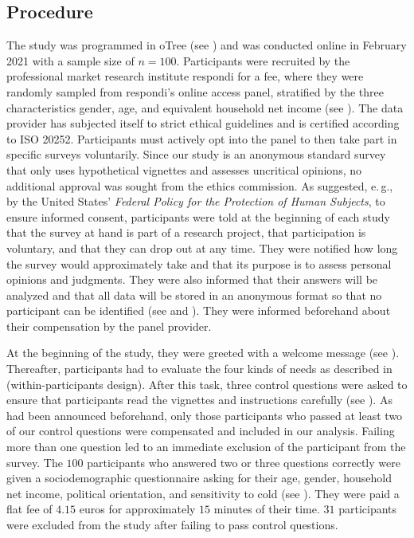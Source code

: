 \documentclass[10pt,letterpaper]{article}
\begin{document}
\subsection*{Procedure}\label{sec:study_1_procedure}
The study was programmed in oTree (see \cite{chen_otree_2016}) and was conducted online in February 2021 with a sample size of $n=100$.
Participants were recruited by the professional market research institute respondi for a fee, where they were randomly sampled from respondi's online access panel, stratified by the three characteristics gender, age, and equivalent household net income (see ).
The data provider has subjected itself to strict ethical guidelines and is certified according to ISO 20252.
Participants must actively opt into the panel to then take part in specific surveys voluntarily.
Since our study is an anonymous standard survey that only uses hypothetical vignettes and assesses uncritical opinions, no additional approval was sought from the ethics commission.
As suggested, e.\,g., by the United States' \textit{Federal Policy for the Protection of Human Subjects}, to ensure informed consent, participants were told at the beginning of each study that the survey at hand is part of a research project, that participation is voluntary, and that they can drop out at any time.
They were notified how long the survey would approximately take and that its purpose is to assess personal opinions and judgments.
They were also informed that their answers will be analyzed and that all data will be stored in an anonymous format so that no participant can be identified (see  and ).
They were informed beforehand about their compensation by the panel provider.

At the beginning of the study, they were greeted with a welcome message (see ).
Thereafter, participants had to evaluate the four kinds of needs as described in  (within-participants design).
After this task, three control questions were asked to ensure that participants read the vignettes and instructions carefully (see ).
As had been announced beforehand, only those participants who passed at least two of our control questions were compensated and included in our analysis.
Failing more than one question led to an immediate exclusion of the participant from the survey.
The $100$ participants who answered two or three questions correctly were given a sociodemographic questionnaire asking for their age, gender, household net income, political orientation, and sensitivity to cold (see ).
They were paid a flat fee of $4.15$ euros for approximately $15$ minutes of their time.
$31$ participants were excluded from the study after failing to pass control questions.
\end{document}

